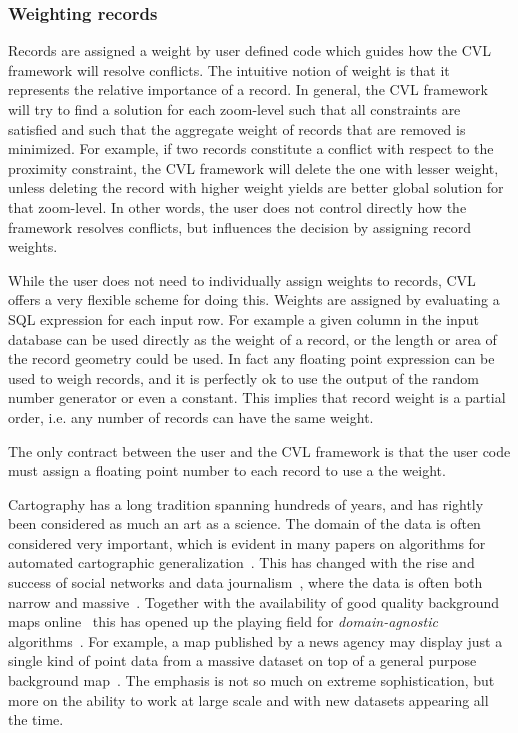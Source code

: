 \subsubsection{Weighting records}
Records are assigned a weight by user defined code which guides how the CVL framework will resolve conflicts.  The intuitive notion of weight is that it represents the relative importance of a record. In general, the CVL framework will try to find a solution for each zoom-level such that all constraints are  satisfied and such that the aggregate weight of records that are removed is minimized. For example, if two records constitute a conflict with respect to the proximity constraint, the CVL framework will delete the one with lesser weight, unless deleting the record with higher weight yields are better global solution for that zoom-level. In other words, the user does not control directly how the framework resolves conflicts, but influences the decision by assigning record weights. 

While the user does not need to individually assign weights to records, CVL offers a very flexible scheme for doing this. Weights are assigned by evaluating a SQL expression for each input row. For example a given column in the input database can be used directly as the weight of a record, or the length or area of the record geometry could be used. In fact any floating point expression can be used to weigh records, and it is perfectly ok to use the output of the random number generator or even a constant. This implies that record weight is a partial order, i.e. any number of records can have the same weight.

The only contract between the user and the CVL framework is that the user code must assign a floating point number to each record to use a the weight.


Cartography has a long tradition spanning hundreds of years, and has rightly been considered as much an art as a science. The domain of the data is often considered very important, which is evident in many papers on algorithms for automated cartographic generalization~\cite{areaagg,ordnance,another}. This has changed with the rise and success of social networks and data journalism~\cite{datajournalism}, where the data is often both narrow and massive~\cite{twitter,datablog}. Together with the availability of good quality background maps online~\cite{bing,google,osm} this has opened up the playing field for \emph{domain-agnostic} algorithms~\cite{fusiontables,samet}. For example, a map published by a news agency may display just a single kind of point data from a massive dataset on top of a general purpose background map~\cite{iraq}. The emphasis is not so much on extreme sophistication, but more on the ability to work at large scale and with new datasets appearing all the time.

